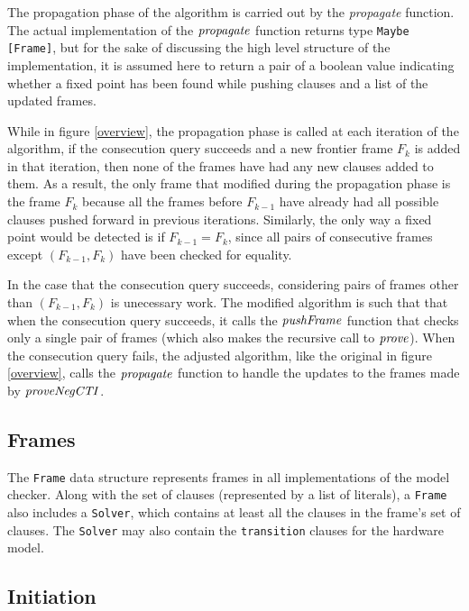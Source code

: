\documentclass[12pt,a4paper,twoside,openright]{report}
\begin{document}
{The propagation phase of the algorithm is carried out by the {\it propagate} function.
The actual implementation of the ${\it propagate}$ function returns type \verb,Maybe [Frame],,
but for the sake of discussing the high level structure of the implementation,
it is assumed here to return a pair of a boolean value indicating whether a fixed point
has been found while pushing clauses and a list of the updated frames.

While in figure \ref{overview}, the propagation phase is called at each iteration
of the algorithm, if the consecution query succeeds and a new frontier frame $F_k$
is added in that iteration, then none of the frames have had any new clauses
added to them. As a result, the only frame that modified during the propagation phase
is the frame $F_k$ because all the frames before $F_{k - 1}$ have already had all
possible clauses pushed forward in previous iterations.
Similarly, the only way a fixed point would be detected is if $F_{k - 1} = F_k$,
since all pairs of consecutive frames except $(F_{k - 1}, F_k)$ have been checked for
equality.

In the case that the consecution query succeeds, considering pairs of frames other
than $(F_{k - 1}, F_k)$ is unecessary work. The modified algorithm is such that
that when the consecution query succeeds, it calls the ${\it pushFrame}$ function that
checks only a single pair of frames (which also makes the recursive call to ${\it prove}$).
When the consecution query fails, the adjusted algorithm, like the original in figure \ref{overview},
calls the ${\it propagate}$ function to handle the updates to the frames made by ${\it proveNegCTI}$.

\subsection{Frames}
The \verb,Frame, data structure represents frames in all implementations of the model checker.
Along with the set of clauses (represented by a list of literals), a \verb,Frame, also includes
a \verb,Solver,, which contains at least all the clauses in the frame's set of clauses. The
\verb,Solver, may also contain the \verb,transition, clauses for the hardware model.

\subsection{Initiation}

}
\end{document}

